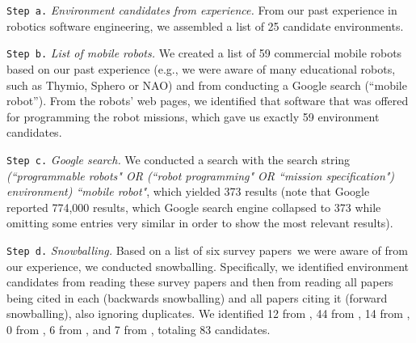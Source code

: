 \texttt{Step a.} \emph{Environment candidates from experience.} From our past experience in robotics software engineering, we assembled a list of 25 candidate environments.

\texttt{Step b.} \emph{List of mobile robots.} We created a list of 59 commercial mobile robots based on our past experience (e.g., we were aware of many educational robots, such as Thymio, Sphero or NAO) and from conducting a Google search (``mobile robot'').
From the robots' web pages, we identified that software that was offered for programming the robot missions, which gave us exactly 59 environment candidates.

\texttt{Step c.} \emph{Google search.} We conducted a search with the search string \emph{(``programmable robots" OR (``robot programming" OR ``mission specification") environment) ``mobile robot"}, which yielded 373 results (note that Google reported 774,000 results, which Google search engine collapsed to 373  while omitting some entries very similar in order to show the most relevant results).


\texttt{Step d.} \emph{ Snowballing.} Based on a list of six survey papers\,\cite{Biggs2003,Bravo2018,Jost2015,Luckcuck2018,Nordmann2016a,Hentout2017} we were aware of from our experience, we conducted snowballing. Specifically, we identified environment candidates from reading these survey papers and then from reading all papers being cited in each (backwards snowballing) and all papers citing it (forward snowballing), also ignoring duplicates. We identified 12 from \citet{Biggs2003}, 44 from \citet{Bravo2018}, 14 from \citet{Jost2015}, 0 from \citet{Luckcuck2018}, 6 from \citet{Nordmann2016a}, and 7 from \citet{Hentout2017}, totaling 83 candidates.

